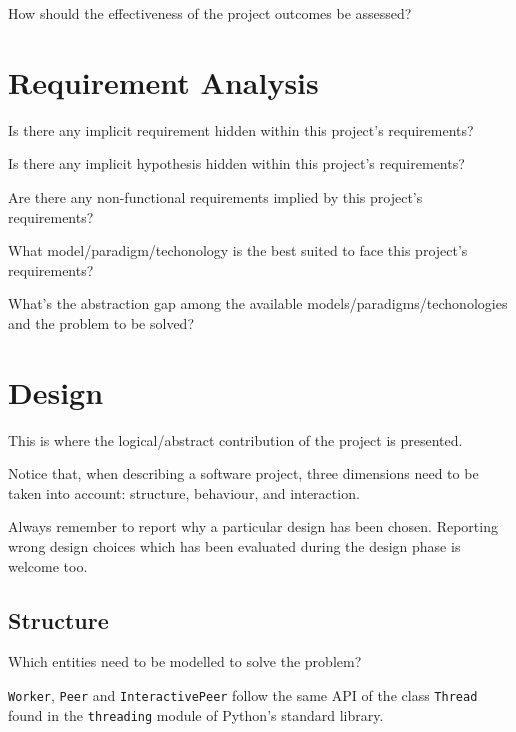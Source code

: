 \documentclass[12pt,a4paper,oneside,article]{article}
\begin{document}
			How should the effectiveness of the project outcomes be assessed?
	
	\section{Requirement Analysis}
		Is there any implicit requirement hidden within this project's requirements?
		
		Is there any implicit hypothesis hidden within this project's requirements?
		
		Are there any non-functional requirements implied by this project's requirements?
		
		What model/paradigm/techonology is the best suited to face this project's requirements?
		
		What's the abstraction gap among the available models/paradigms/techonologies and the problem to be solved?
	
	\section{Design}
		This is where the logical/abstract contribution of the project is presented.
		
		Notice that, when describing a software project, three dimensions need to be taken into account: structure, behaviour, and interaction.
		
		Always remember to report why a particular design has been chosen. Reporting wrong design choices which has been evaluated during the design phase is welcome too.
		
		\subsection{Structure}
			Which entities need to be modelled to solve the problem?
			
			\texttt{Worker}, \texttt{Peer} and \texttt{InteractivePeer} follow the same API of the class \texttt{Thread} found in the \texttt{threading} module of Python's standard library.
			
\end{document}
